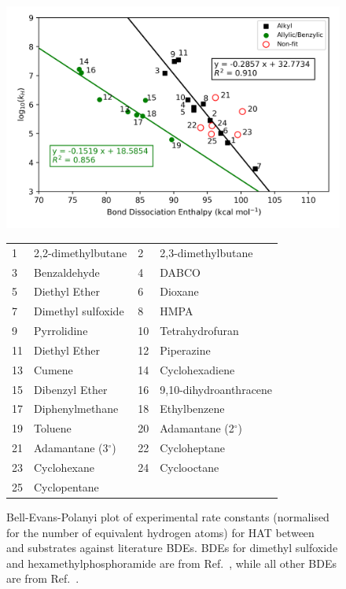 \begin{figure}[H]
  \centering
  \hspace*{-2cm}
  \includegraphics[width=1.2\textwidth]{figures/bep-expt}
\begin{tabularx}{\textwidth}{| l X l X |}
  \hline
  1 & 2,2-dimethylbutane & 2 & 2,3-dimethylbutane \\
  3 & Benzaldehyde & 4 & DABCO \\
  5 & Diethyl Ether & 6 & Dioxane \\
  7 & Dimethyl sulfoxide & 8 & HMPA \\
  9 & Pyrrolidine & 10 & Tetrahydrofuran \\
  11 & Diethyl Ether & 12 & Piperazine \\
  13 & Cumene & 14 & Cyclohexadiene \\
  15 & Dibenzyl Ether & 16 & 9,10-dihydroanthracene \\
  17 & Diphenylmethane & 18 & Ethylbenzene \\
  19 & Toluene & 20 & Adamantane (2$^\circ$) \\
  21 & Adamantane (3$^\circ$) & 22 & Cycloheptane \\
  23 & Cyclohexane & 24 & Cyclooctane \\
  25 & Cyclopentane &  &  \\
  \hline
\end{tabularx}
  \caption[Bell-Evans-Polanyi plot of experimental rate constants against literature BDEs.]{Bell-Evans-Polanyi plot of experimental rate constants (normalised for the number of equivalent hydrogen atoms) for HAT between \cumo~ and substrates against literature BDEs. BDEs for dimethyl sulfoxide and hexamethylphosphoramide are from Ref.~\protect{}, while all other BDEs are from Ref.~\protect{}.}
\label{fig:bep-expt}
\end{figure}

